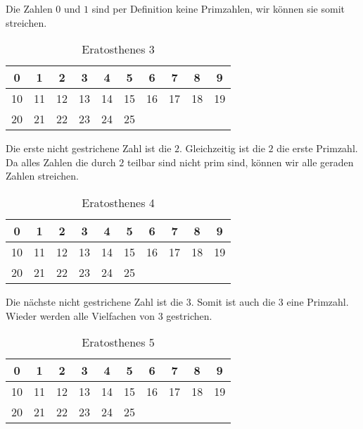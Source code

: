 	\noindent Die Zahlen $0$ und $1$ sind per Definition keine Primzahlen, wir k\"onnen sie somit streichen.	 	
	
	\begin{table}[!ht] 
		\centering
		\begin{tabular}{|c|c|c|c|c|c|c|c|c|c|}
			\hline
			\cellcolor{red}0  & \cellcolor{red} 1 &  2 &  3 &  \cellcolor{red}4 &  5 & \cellcolor{red} 6 &  7 & \cellcolor{red} 8 &  9 \\
			\hline
			\cellcolor{red}10 & 11 & \cellcolor{red}12 & 13 & \cellcolor{red}14 & 15 & \cellcolor{red}16 & 17 & \cellcolor{red}18 & 19 \\
			\hline
			\cellcolor{red}20 & 21 & \cellcolor{red}22 & 23 & \cellcolor{red}24 & 25 & \ & \ & \ & \ \\
			\hline
		\end{tabular}
		\caption{Eratosthenes 3}
		\label{tab:eratosthenes3}
	\end{table}
	
	\noindent Die erste nicht gestrichene Zahl ist die $2$. Gleichzeitig ist die $2$ die erste Primzahl. Da alles Zahlen die durch $2$ teilbar sind nicht prim sind, k\"onnen wir alle geraden Zahlen streichen. 
	
	\begin{table}[!ht] 
		\centering
		\begin{tabular}{|c|c|c|c|c|c|c|c|c|c|}
			\hline	 		 			
			\cellcolor{red}0  & \cellcolor{red} 1 &  2 &  3 & \cellcolor{red}4 &  5 & \cellcolor{red} 6 &  7 & \cellcolor{red} 8 &  \cellcolor{red}9 \\
			\hline
			\cellcolor{red}10 & 11 & \cellcolor{red}12 & 13 & \cellcolor{red}14 & \cellcolor{red}15 & \cellcolor{red}16 & 17 & \cellcolor{red}18 & 19 \\
			\hline
			\cellcolor{red}20 & \cellcolor{red}21 & \cellcolor{red}22 & 23 & \cellcolor{red}24 & 25 &  &  &  &  \\
			\hline
		\end{tabular}
		\caption{Eratosthenes 4}
		\label{tab:eratosthenes4}
	\end{table}
	
	\noindent Die n\"achste nicht gestrichene Zahl ist die $3$. Somit ist auch die $3$ eine Primzahl. Wieder werden alle Vielfachen von $3$ gestrichen.
	
	\begin{table}[!ht] 
		\centering
		\begin{tabular}{|c|c|c|c|c|c|c|c|c|c|}
			\hline	 		 			
			\cellcolor{red}0  & \cellcolor{red} 1 &  2 &  3 & \cellcolor{red}4 &  5 & \cellcolor{red} 6 &  7 & \cellcolor{red} 8 &  \cellcolor{red}9 \\
			\hline
			\cellcolor{red}10 & 11 & \cellcolor{red}12 & 13 & \cellcolor{red}14 & \cellcolor{red}15 & \cellcolor{red}16 & 17 & \cellcolor{red}18 & 19 \\
			\hline
			\cellcolor{red}20 & \cellcolor{red}21 & \cellcolor{red}22 & 23 & \cellcolor{red}24 & \cellcolor{red}25 &  &  & &  \\
			\hline
		\end{tabular}
		\caption{Eratosthenes 5}
		\label{tab:eratosthenes5}
	\end{table}	
	
